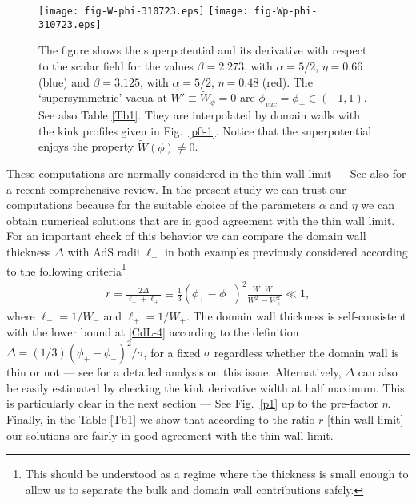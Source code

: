 \documentclass[aps,12pt, a4paper,nofootinbib]{revtex4}
\begin{document}
{\begin{figure}[!ht]
\begin{center}
\texttt{[image: fig-W-phi-310723.eps]}\qquad\qquad\qquad
\texttt{[image: fig-Wp-phi-310723.eps]}
\caption{The figure shows the superpotential and its derivative with respect to the scalar field for the values $\beta=2.273$, with $\alpha=5/2$, $\eta=0.66$ (blue) and $\beta=3.125$, with $\alpha=5/2$, $\eta=0.48$ (red). The `supersymmetric' vacua at $W'\equiv\tilde{W}_\phi=0$ are $\phi_{vac}=\phi_\pm \in (-1,1)$. See also Table \ref{Tb1}. They are interpolated by domain walls with the kink profiles given in Fig.~\ref{p0-1}. Notice that the superpotential enjoys the property $\tilde{W}(\phi)\neq 0$.}
\label{W-Wp}
\end{center}
\end{figure}
These computations are normally considered in the thin wall limit \cite{Coleman:1980aw} --- See also \cite{Ghosh:2021lua} for a recent comprehensive review. In the present study we can trust our computations because for the suitable choice of the parameters $\alpha$ and $\eta$ we can obtain numerical solutions that are in good agreement with the thin wall limit. For an important check of this behavior we can compare the domain wall thickness $\Delta$ with AdS radii $\ell_\pm$ in both examples previously considered according to the following criteria\footnote{This should be understood as a regime where the thickness is small enough to allow us to separate the bulk and domain wall contributions safely.} 
\begin{eqnarray}\label{thin-wall-limit}
r=\frac{2\Delta}{\ell_- + \ell_+}\equiv\frac13(\phi_+ - \phi_-)^2\frac{W_+ W_-}{W_-^2 -W_+^2}\ll 1,
\end{eqnarray}
where $\ell_- =1/W_-$ and $\ell_+ =1/W_+$. The domain wall thickness is self-consistent with the lower bound at \eqref{CdL-4} according to the definition $\Delta = (1/3) (\phi_+ - \phi_-)^2/\sigma$, for a fixed $\sigma$ regardless whether the domain wall is thin or not --- see \cite{Brito:2001hd,Bazeia:2004yw} for a detailed analysis on this issue. Alternatively, $\Delta$ can also be easily estimated by checking the kink derivative width at half maximum. This is particularly clear in the next section --- See Fig.~\ref{p1} up to the pre-factor $\eta$. Finally, in the Table \ref{Tb1} we show that according to the ratio $r$ \eqref{thin-wall-limit} our solutions are fairly in good agreement with the thin wall limit.



}
\end{document}
